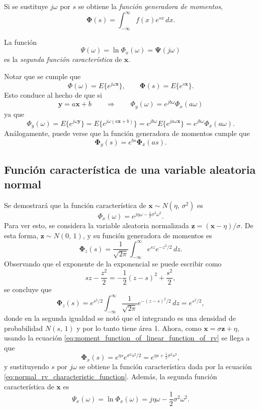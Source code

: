 \documentclass[a4paper]{report}
\newcommand{\x}{\mathbf{x}}
\newcommand{\y}{\mathbf{y}}
\newcommand{\z}{\mathbf{z}}
\newcommand{\Phibf}{\mathbf{\Phi}}
\newcommand{\Psibf}{\mathbf{\Psi}}
\begin{document}
Si se sustituye \(j\omega\) por \(s\) se obtiene la \emph{función generadora de momentos},
\begin{equation}\label{eq:moment_generating_function}
 \Phibf(s)=\int_{-\infty}^{\infty}f(x)e^{s x}\,dx.
\end{equation}

La función
\[
 \Psi(\omega)=\ln\Phi_x(\omega)=\Psibf(j\omega)
\]
es la \emph{segunda función característica} de \(\x\).

Notar que se cumple que
\[
 \Phi(\omega)=E\{e^{j\omega\x}\},\qquad \Phibf(s)=E\{e^{s\x}\}.
\]
Esto conduce al hecho de que si
\begin{equation}\label{eq:characteristic_function_of_linear_function_of_rv}
 \y=a\x+b\qquad\Rightarrow\qquad \Phi_y(\omega)=e^{jb\omega}\Phi_x(a\omega)
\end{equation}
ya que
\[
 \Phi_y(\omega)=E\{e^{j\omega\y}\}=E\{e^{j\omega(a\x+b)}\}=e^{jb\omega}E\{e^{ja\omega \x}\}=e^{j b\omega}\Phi_x(a\omega).
\]
Análogamente, puede verse que la función generadora de momentos cumple que
\begin{equation}\label{eq:moment_function_of_linear_function_of_rv}
  \Phibf_y(s)=e^{bs}\Phibf_x(as).
\end{equation}

\subsection{Función característica de una variable aleatoria normal}

Se demostrará que la función característica de \(\x\sim N(\eta,\,\sigma^2)\) es
\begin{equation}\label{eq:normal_rv_characteristic_function}
 \Phi_x(\omega)=e^{j\eta\omega-\frac{1}{2}\sigma^2\omega^2}.
\end{equation}
Para ver esto, se considera la variable aleatoria normalizada \(\z=(\x-\eta)/\sigma\). De esta forma, \(\z\sim N(0,\,1)\), y su función generadora de momentos es
\[
 \Phibf_z(s)=\frac{1}{\sqrt{2\pi}}\int_{-\infty}^{\infty}e^{sz}e^{-z^2/2}\,dz.
\]
Observando que el exponente de la exponencial se puede escribir como
\[
 sz-\frac{z^2}{2}=-\frac{1}{2}(z-s)^2+\frac{s^2}{2},
\]
se concluye que
\[
 \Phibf_z(s)=e^{s^2/2}\int_{-\infty}^{\infty}\frac{1}{\sqrt{2\pi}}e^{-(z-s)^2/2}\,dz=e^{s^2/2},
\]
donde en la segunda igualdad se notó que el integrando es una densidad de probabilidad \(N(s,\,1)\) y por lo tanto tiene área 1. Ahora, como \(\x=\sigma\z+\eta\), usando la ecuación \ref{eq:moment_function_of_linear_function_of_rv} se llega a que
\begin{equation}\label{eq:normal_rv_moment_function}
 \Phibf_x(s)=e^{\eta s}e^{\sigma^2s^2/2}=e^{\eta s+\frac{1}{2}\sigma^2s^2},
\end{equation}
y sustituyendo \(s\) por \(j\omega\) se obtiene la función característica dada por la ecuación \ref{eq:normal_rv_characteristic_function}. Además, la segunda función característica de \(\x\) es
\begin{equation}\label{eq:normal_rv_second_characteristic_function}
 \Psi_x(\omega)=\ln\Phi_x(\omega)=j\eta\omega-\frac{1}{2}\sigma^2\omega^2.
\end{equation}
\end{document}
